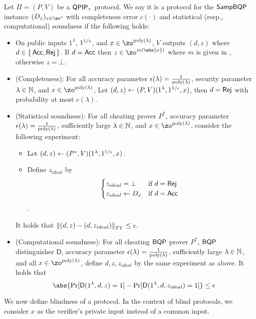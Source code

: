 \begin{definition}
	\label{dfn:stats-secure-proto-sampbqp}
	Let $\Pi=(P, V)$ be a $\operatorname{\mathsf{QPIP}}_\tau$ protocol.
	We say it is a protocol for the $\operatorname{\mathsf{SampBQP}}$ instance $(D_x)_{x\in\zo^*}$ with completeness error $c(\cdot)$ and statistical (resp., computational) soundness if the following holds:
	\begin{itemize}
		\item On public inputs $1^\lambda$, $1^{1/\epsilon}$, and $x\in\zo^{\poly(\lambda)}$, $V$ outputs $(d, z)$ where $d\in\set{\mathsf{Acc}, \mathsf{Rej}}$.
			If $d=\mathsf{Acc}$ then $z\in\zo^{m(\abs{x})}$ where $m$ is given in , otherwise $z=\bot$.
		\item (Completeness):
			For all accuracy parameter $\epsilon(\lambda)=\frac{1}{\operatorname*{\operatorname{poly}}(\lambda)}$,
			security parameter $\lambda\in\mathbb{N}$,
			and $x\in\zo^{\poly(\lambda)}$, 
			Let $(d, z)\leftarrow(P, V)(1^\lambda, 1^{1/\epsilon}, x)$, then $d=\mathsf{Rej}$ with probability at most $c(\lambda)$.
		\item (Statistical soundness): For all cheating prover $P^*$,
		    accuracy parameter $\epsilon(\lambda)=\frac{1}{\operatorname*{\operatorname{poly}}(\lambda)}$,
			sufficiently large $\lambda\in\mathbb{N}$, and $x\in\zo^{\poly(\lambda)}$, 
			consider the following experiment:
			\begin{itemize}
				\item Let $(d, z)\leftarrow(P^*, V)(1^\lambda, 1^{1/\epsilon}, x)$.
				\item Define $z_{ideal}$ by
				$$\begin{cases}
					z_{ideal}=\bot & \text{if } d=\mathsf{Rej}\\
					z_{ideal}\leftarrow D_x & \text{if } d=\mathsf{Acc}
				\end{cases}$$.
			\end{itemize}
			It holds that $\left\lVert(d,z)-(d,z_{ideal})\right\rVert_{TV}\leq\epsilon$. 
		\item (Computational soundness):
		For all cheating $\operatorname{\mathsf{BQP}}$ prover $P^*$, $\operatorname{\mathsf{BQP}}$ distinguisher $\mathsf{D}$, accuracy parameter $\epsilon(\lambda)=\frac{1}{\operatorname*{\operatorname{poly}}(\lambda)}$,
			sufficiently large $\lambda\in\mathbb{N}$, and all $x\in\zo^{\poly(\lambda)}$, 
			define $d, z, z_{ideal}$ by the same experiment as above.
			It holds that
			$$\abs{\Pr[\mathsf{D}(1^{\lambda}, d,z) = 1] - \Pr[\mathsf{D}(1^{\lambda}, d,z_{ideal}) = 1]} \leq \eps $$
	\end{itemize}
\end{definition}

We now define blindness of a protocol.
In the context of blind protocols, we consider $x$ as the verifier's private input instead of a common input.  

